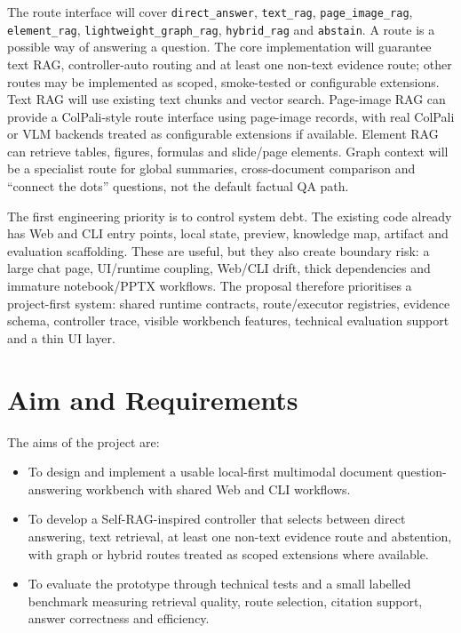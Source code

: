 \documentclass[a4paper,11pt]{article}
\begin{document}
The route interface will cover \texttt{direct\_answer}, \texttt{text\_rag}, \texttt{page\_image\_rag}, \texttt{element\_rag}, \texttt{lightweight\_graph\_rag}, \texttt{hybrid\_rag} and \texttt{abstain}. A route is a possible way of answering a question. The core implementation will guarantee text RAG, controller-auto routing and at least one non-text evidence route; other routes may be implemented as scoped, smoke-tested or configurable extensions. Text RAG will use existing text chunks and vector search. Page-image RAG can provide a ColPali-style route interface using page-image records, with real ColPali or VLM backends treated as configurable extensions if available. Element RAG can retrieve tables, figures, formulas and slide/page elements. Graph context will be a specialist route for global summaries, cross-document comparison and ``connect the dots'' questions, not the default factual QA path.

The first engineering priority is to control system debt. The existing code already has Web and CLI entry points, local state, preview, knowledge map, artifact and evaluation scaffolding. These are useful, but they also create boundary risk: a large chat page, UI/runtime coupling, Web/CLI drift, thick dependencies and immature notebook/PPTX workflows. The proposal therefore prioritises a project-first system: shared runtime contracts, route/executor registries, evidence schema, controller trace, visible workbench features, technical evaluation support and a thin UI layer.

\section{Aim and Requirements}

The aims of the project are:

\begin{itemize}
  \item To design and implement a usable local-first multimodal document question-answering workbench with shared Web and CLI workflows.
  \item To develop a Self-RAG-inspired controller that selects between direct answering, text retrieval, at least one non-text evidence route and abstention, with graph or hybrid routes treated as scoped extensions where available.
  \item To evaluate the prototype through technical tests and a small labelled benchmark measuring retrieval quality, route selection, citation support, answer correctness and efficiency.
\end{itemize}
\end{document}

